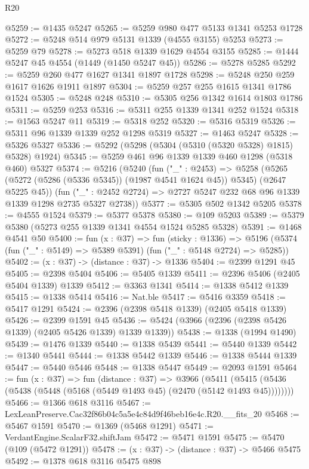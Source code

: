 \begin{lexlean}{R20}
\begin{coremodule}
@5259 := @1435 @5247
@5265 := @5259 @980 @477 @5133 @1341 @5253 @1728
@5272 := @5248 @514 @979 @5131 @1339 (@4555 @3155) @5253
@5273 := @5259 @79
@5278 := @5273 @518 @1339 @1629 @4554 @3155
@5285 := @1444 @5247 @45 @4554 (@1449 (@1450 @5247 @45))
@5286 := @5278 @5285
@5292 := @5259 @260 @477 @1627 @1341 @1897 @1728
@5298 := @5248 @250 @259 @1617 @1626 @1911 @1897
@5304 := @5259 @257 @255 @1615 @1341 @1786 @1524
@5305 := @5248 @248
@5310 := @5305 @256 @1342 @1614 @1803 @1786
@5311 := @5259 @253
@5316 := @5311 @255 @1339 @1341 @252 @1524
@5318 := @1563 @5247 @11
@5319 := @5318 @252
@5320 := @5316 @5319
@5326 := @5311 @96 @1339 @1339 @252 @1298 @5319
@5327 := @1463 @5247
@5328 := @5326 @5327
@5336 := @5292 (@5298 (@5304 (@5310 (@5320 @5328) @1815) @5328) @1924)
@5345 := @5259 @461 @96 @1339 @1339 @460 @1298 (@5318 @460) @5327
@5374 := @5216
    (@5240
      (fun ("_" : @2453) =>
      @5258 (@5265 (@5272 (@5286 (@5336 @5345)) (@1987 @4541 @1624 @45)) @5345) (@2647 @5225 @45))
      (fun ("_" : @2452 @2724) => @2727 @5247 @232 @68 @96 @1339 @1339 @1298 @2735 @5327 @2738))
@5377 := @5305 @502 @1342 @5205
@5378 := @4555 @1524
@5379 := @5377 @5378
@5380 := @109 @5203
@5389 := @5379 @5380 (@5273 @255 @1339 @1341 @4554 @1524 @5285 @5328)
@5391 := @1468 @4541 @50
@5400 := fun (x : @37) =>
  fun (sticky : @1336) =>
  @5196 (@5374 (fun ("_" : @5149) => @5389 @5391) (fun ("_" : @5148 @2724) => @5285))
@5402 := (x : @37) -> (distance : @37) -> @1336
@5404 := @2399 @1291 @45
@5405 := @2398 @5404
@5406 := @5405 @1339
@5411 := @2396 @5406 (@2405 @5404 @1339) @1339
@5412 := @3363 @1341
@5414 := @1338 @5412 @1339
@5415 := @1338 @5414
@5416 := Nat.ble
@5417 := @5416 @3359
@5418 := @5417 @1291
@5424 := @2396 (@2398 @5418 @1339) (@2405 @5418 @1339)
@5426 := @2399 @1591 @45
@5436 := @5424 (@3966 (@2396 (@2398 @5426 @1339) (@2405 @5426 @1339) @1339 @1339))
@5438 := @1338 (@1994 @1490)
@5439 := @1476 @1339
@5440 := @1338 @5439
@5441 := @5440 @1339
@5442 := @1340 @5441
@5444 := @1338 @5442 @1339
@5446 := @1338 @5444 @1339
@5447 := @5440 @5446
@5448 := @1338 @5447
@5449 := @2093 @1591
@5464 := fun (x : @37) =>
  fun (distance : @37) =>
  @3966 (@5411 (@5415 (@5436 (@5438 (@5448 (@5168 (@5449 @1493 @45) (@2470 (@5142 @1493 @45))))))))
@5466 := @1366 @618 @3116
@5467 := LexLeanPreserve.Cac32f86b04c5a5e4c84d9f46beb16e4c.R20.__fits_20
@5468 := @5467 @1591
@5470 := @1369 (@5468 @1291)
@5471 := VerdantEngine.ScalarF32.shiftJam
@5472 := @5471 @1591
@5475 := @5470 (@109 (@5472 @1291))
@5478 := (x : @37) -> (distance : @37) -> @5466 @5475
@5492 := @1378
    @618
    @3116
    @5475
    @898

\end{coremodule}
\end{lexlean}
